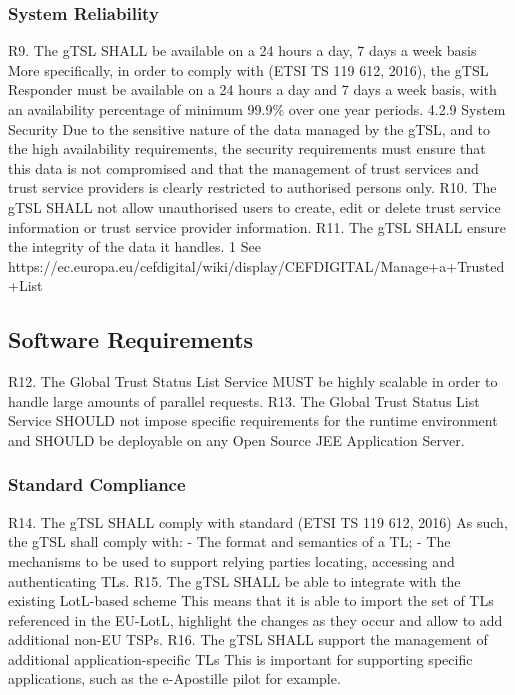 \documentclass{tnreport}
\begin{document}
\subsubsection{System Reliability}

R9. The gTSL SHALL be available on a 24 hours a day, 7 days a week basis
More specifically, in order to comply with (ETSI TS 119 612, 2016), the gTSL Responder must be available on a 24 hours a day and 7 days a week basis, with an availability percentage of minimum 99.9\% over one year periods.
4.2.9 System Security
Due to the sensitive nature of the data managed by the gTSL, and to the high availability requirements, the security requirements must ensure that this data is not compromised and that the management of trust services and trust service providers is clearly restricted to authorised persons only.
R10. The gTSL SHALL not allow unauthorised users to create, edit or delete trust service information or trust service provider information.
R11. The gTSL SHALL ensure the integrity of the data it handles.
1 See https://ec.europa.eu/cefdigital/wiki/display/CEFDIGITAL/Manage+a+Trusted+List

\subsection{Software Requirements}

R12. The Global Trust Status List Service MUST be highly scalable in order to handle large amounts of parallel requests.
R13. The Global Trust Status List Service SHOULD not impose specific requirements for the runtime environment and SHOULD be deployable on any Open Source JEE Application Server.

\subsubsection{Standard Compliance}

R14. The gTSL SHALL comply with standard (ETSI TS 119 612, 2016)
As such, the gTSL shall comply with:
- The format and semantics of a TL;
- The mechanisms to be used to support relying parties locating, accessing and authenticating TLs.
R15. The gTSL SHALL be able to integrate with the existing LotL-based scheme
This means that it is able to import the set of TLs referenced in the EU-LotL, highlight the changes as they occur and allow to add additional non-EU TSPs.
R16. The gTSL SHALL support the management of additional application-specific TLs
This is important for supporting specific applications, such as the e-Apostille pilot for example.
\end{document}
